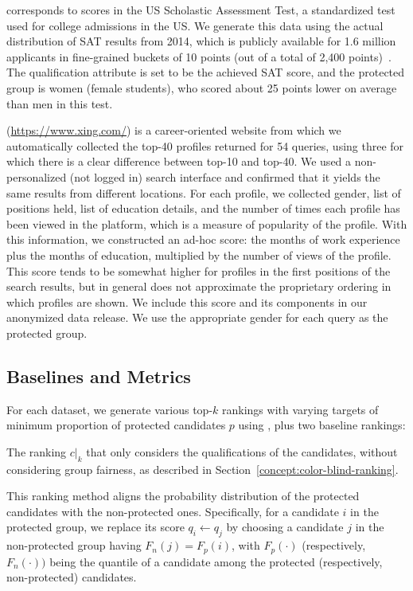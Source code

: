  corresponds to scores in the US Scholastic Assessment Test, a standardized test used for college admissions in the US.
We generate this data using the actual distribution of SAT results from 2014, which is publicly available for 1.6 million applicants in fine-grained buckets of 10 points (out of a total of 2,400 points)~\cite{sat_2014}.
%
The qualification attribute is set to be the achieved SAT score, and the protected group is women (female students), who scored about 25 points lower on average than men in this test.

 (\url{https://www.xing.com/}) is a career-oriented website from which we automatically collected the top-40 profiles returned for 54 queries, using three for which there is a clear difference between top-10 and top-40.
%
We used a non-personalized (not logged in) search interface and confirmed that it yields the same results from different locations.\label{concept:XING}
%
For each profile, we collected gender, list of positions held, list of education details, and the number of times each profile has been viewed in the platform, which is a measure of popularity of the profile.
%
With this information, we constructed an ad-hoc score: 
the months of work experience %
plus the months of education, %
multiplied by the number of views of the profile.
%
This score tends to be somewhat higher for profiles in the first positions of the search results, but in general does not approximate the proprietary ordering in which profiles are shown. %
%
We include this score and its components in our anonymized data release.
%
We use the appropriate gender for each query as the protected group.

\subsection{Baselines and Metrics}\label{sec:experiments-baselines}

For each dataset, we generate various top-$k$ rankings with varying targets of minimum proportion of protected candidates $p$ using \algoFAIR, plus two baseline rankings:

 The ranking $c|_k$ that only considers the qualifications of the candidates, without considering group fairness, as described in Section~\ref{concept:color-blind-ranking}.

 This ranking method aligns the probability distribution of the protected candidates with the non-protected ones. Specifically, for a candidate $i$ in the protected group, we replace its score $q_i \leftarrow q_j$ by choosing a candidate $j$ in the non-protected group having $F_n(j) = F_p(i)$, with $F_p(\cdot)$ (respectively, $F_n(\cdot))$ being the quantile of a candidate among the protected (respectively, non-protected) candidates.

